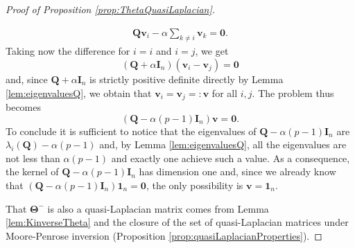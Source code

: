 \documentclass[12pt]{article}
\theoremstyle{plain}
\theoremstyle{remark}
\newcommand{\onen}[0]{{\mathbf{1}_{n}}}
\newcommand{\dVec}[1]{{\bm{#1}}}            %
\newcommand{\latMatr}[1]{\mathbf{#1}}          %
\newcommand{\grMatr}[1]{{\boldsymbol{#1}}}   %
\begin{document}
\begin{proof}[Proof of Proposition \ref{prop:ThetaQuasiLaplacian}]
\begin{enumerate}
\begin{align*}
                \latMatr{Q} \dVec v_i - \alpha \sum_{k\ne i} \dVec v_k = \dVec 0.
            \end{align*}
            Taking now the difference for $i=i$ and $i=j$, we get
            \begin{equation*}
                (\latMatr{Q}+\alpha \latMatr{I}_n)(\dVec v_i-\dVec v_j)=\dVec 0
            \end{equation*}
            and, since $\latMatr{Q}+\alpha \latMatr{I}_n$ is strictly positive definite directly by Lemma \ref{lem:eigenvaluesQ}, we obtain that $\dVec v_i=\dVec v_j=:\dVec v$ for all $i,j$. The problem thus becomes
            \begin{equation*}
                (\latMatr{Q}-\alpha(p-1)\latMatr{I}_n) \dVec v = \dVec 0.
            \end{equation*}
            To conclude it is sufficient to notice that the eigenvalues of $\latMatr{Q}-\alpha(p-1) \latMatr{I}_n$ are $\lambda_i(\latMatr{Q}) - \alpha (p-1)$ and, by Lemma \ref{lem:eigenvaluesQ}, all the eigenvalues are not less than $\alpha(p-1)$ and exactly one achieve such a value. As a consequence, the kernel of $\latMatr{Q}-\alpha (p-1)\latMatr{I}_n$ has dimension one and, since we already know that $(\latMatr{Q}-\alpha (p-1)\latMatr{I}_n)\onen=\dVec 0$, the only possibility is $\dVec v=\onen$.
        \end{enumerate}
    
        That $\grMatr{\Theta}^-$ is also a quasi-Laplacian matrix comes from Lemma \ref{lem:KinverseTheta} and the closure of the set of quasi-Laplacian matrices under Moore-Penrose inversion (Proposition \ref{prop:quasiLaplacianProperties}).
        
    \end{proof}
    
\end{document}
